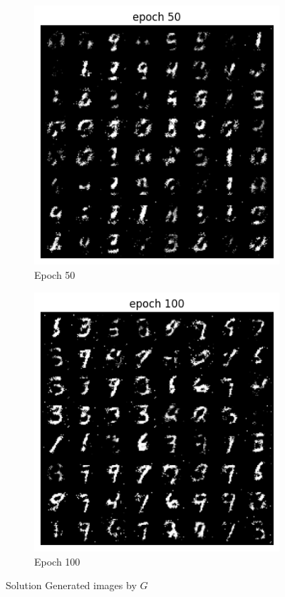 \documentclass[a4paper]{article}
\theoremstyle{definition}
\newenvironment{soln}{
	\leavevmode\color{blue}\ignorespaces
}{}
\begin{document}
\begin{enumerate} [label=(\alph*)]
\begin{soln}
\begin{figure}[H]
\begin{subfigure}[b]{0.3\textwidth}
    				\centering
    				\includegraphics[width=\textwidth]{Images/Q1/Q1c_50.png}
    				\caption{Epoch 50}
    			\end{subfigure}
    			\hfill
    			\begin{subfigure}[b]{0.3\textwidth}
    				\centering
    				\includegraphics[width=\textwidth]{Images/Q1/Q1c_100.png}
    				\caption{Epoch 100}
    			\end{subfigure}
    			\caption{Solution Generated images by $G$}
    			\label{fig:sol1c graphs}
    		\end{figure}
  

\end{soln}
\end{enumerate}
\end{document}
